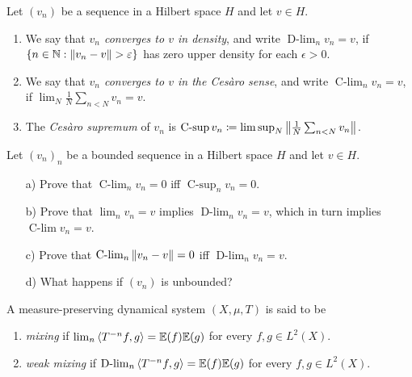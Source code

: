 \documentclass[reqno, twoside]{article}
\newcommand{\Clim}{\operatorname{C-lim}}
\newcommand{\Csup}{\operatorname{C-sup}}
\newcommand{\Dlim}{\operatorname{D-lim}}
\begin{document}
    \begin{definition*}
        Let $(v_n)$ be a sequence in a Hilbert space $H$ and let $v\in H$.
        \begin{enumerate}
            \item We say that \textit{$v_n$ converges to $v$ in density}, and write $\Dlim_nv_n=v$, if $\l\{n\in\N\st\l\|v_n-v\r\|>\epsilon\r\}$ has zero upper density for each $\epsilon>0$.
                \vspace{-0.05in}
            \item We say that \textit{$v_n$ converges to $v$ in the Cesàro sense}, and write $\Clim_nv_n=v$, if $\lim_N\frac{1}{N}\sum_{n<N}v_n=v$.
                \vspace{-0.05in}
            \item The \textit{Cesàro supremum} of $v_n$ is $\Csup v_n\coloneqq\limsup_N\l\|\frac{1}{N}\sum_{n<N}v_n\r\|$.
        \end{enumerate}
    \end{definition*}

    \begin{exercise}\label{equiv}
        Let $(v_n)_n$ be a bounded sequence in a Hilbert space $H$ and let $v\in H$. 
        \begin{enumerate}
            \item[a)] Prove that $\Clim_nv_n=0$ iff $\Csup_nv_n=0$.
                \vspace{-0.05in}
            \item[b)] Prove that $\lim_nv_n=v$ implies $\Dlim_nv_n=v$, which in turn implies $\Clim v_n=v$.
                \vspace{-0.05in}
            \item[c)] Prove that $\Clim_n\l\|v_n-v\r\|=0$ iff $\Dlim_nv_n=v$.
                \vspace{-0.05in}
            \item[d)] What happens if $(v_n)$ is unbounded?
        \end{enumerate}
    \end{exercise}

    \begin{definition*}
        A measure-preserving dynamical system $(X,\mu,T)$ is said to be
        \begin{enumerate}
            \item \textit{mixing} if $\lim_n\left\langle T^{-n}f,g\right\rangle=\mathbb{E}(f)\mathbb{E}(g)$ for every $f,g\in L^2(X)$.
                \vspace{-0.05in}
            \item \textit{weak mixing} if $\Dlim_n\l\langle T^{-n}f,g\r\rangle=\E(f)\E(g)$ for every $f,g\in L^2(X)$.
        \end{enumerate}
    \end{definition*}
\end{document}
